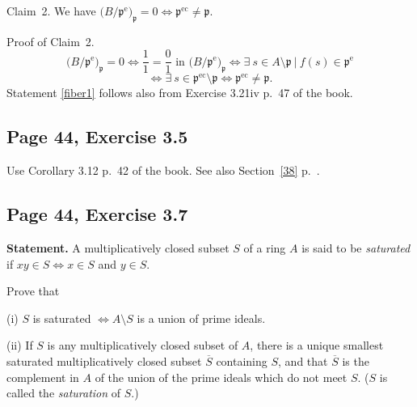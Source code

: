 \documentclass[parskip=half,fontsize=12pt]{scrartcl}%
\newcommand{\oo}{\operatorname}\newcommand{\ooo}{\operatorname*}
\newcommand{\mf}{\mathfrak}
\newcommand{\ppp}{\mf p}
\begin{document}
Claim~2. We have $\big(B/\ppp^{\oo e}\big)_\ppp=0\iff\ppp^{\oo{ec}}\ne\ppp$. 

Proof of Claim~2. 
$$
\big(B/\ppp^{\oo e}\big)_\ppp=0\iff\frac11=\frac01\text{ in }\big(B/\ppp^{\oo e}\big)_\ppp\iff\exists\ s\in A\setminus\ppp\ |\ f(s)\in\ppp^{\oo e}
$$ 
$$
\iff\exists\ s\in\ppp^{\oo{ec}}\setminus\ppp\iff\ppp^{\oo{ec}}\ne\ppp.
$$ 
Statement \eqref{fiber1} follows also from Exercise 3.21iv p.~47 of the book.



\subsection{Page 44, Exercise 3.5}%

Use Corollary 3.12 p.~42 of the book. See also Section~\ref{38} p.~\pageref{38}.

\subsection{Page 44, Exercise 3.7}%

\textbf{Statement.} A multiplicatively closed subset $S$ of a ring $A$ is said to be \emph{saturated} if $xy\in S\iff x\in S$ and $y\in S$. %

Prove that

(i) $S$ is saturated $\iff A\setminus S$ %
is a union of prime ideals.

(ii) If $S$ is any multiplicatively closed subset of $A$, there is a unique smallest saturated multiplicatively closed subset $\overline S$ containing $S$, and that $\overline S$ is the complement in $A$ of the union of the prime ideals which do not meet $S$. ($S$ is called the \emph{saturation} of $S$.)
\end{document}
